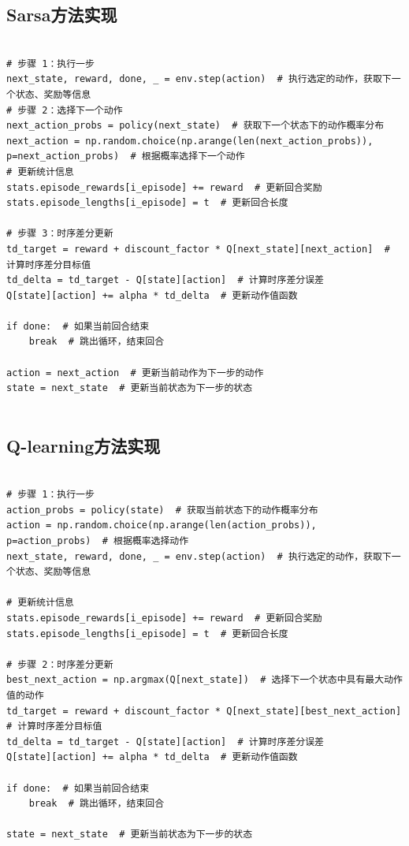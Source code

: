 \documentclass{ctexart}
\begin{document}
\subsection*{Sarsa方法实现}
\begin{verbatim}

# 步骤 1：执行一步
next_state, reward, done, _ = env.step(action)  # 执行选定的动作，获取下一个状态、奖励等信息
# 步骤 2：选择下一个动作
next_action_probs = policy(next_state)  # 获取下一个状态下的动作概率分布
next_action = np.random.choice(np.arange(len(next_action_probs)), p=next_action_probs)  # 根据概率选择下一个动作
# 更新统计信息
stats.episode_rewards[i_episode] += reward  # 更新回合奖励
stats.episode_lengths[i_episode] = t  # 更新回合长度

# 步骤 3：时序差分更新
td_target = reward + discount_factor * Q[next_state][next_action]  # 计算时序差分目标值
td_delta = td_target - Q[state][action]  # 计算时序差分误差
Q[state][action] += alpha * td_delta  # 更新动作值函数

if done:  # 如果当前回合结束
    break  # 跳出循环，结束回合
    
action = next_action  # 更新当前动作为下一步的动作
state = next_state  # 更新当前状态为下一步的状态


\end{verbatim}

\subsection*{Q-learning方法实现}
\begin{verbatim}

# 步骤 1：执行一步
action_probs = policy(state)  # 获取当前状态下的动作概率分布
action = np.random.choice(np.arange(len(action_probs)), p=action_probs)  # 根据概率选择动作
next_state, reward, done, _ = env.step(action)  # 执行选定的动作，获取下一个状态、奖励等信息

# 更新统计信息
stats.episode_rewards[i_episode] += reward  # 更新回合奖励
stats.episode_lengths[i_episode] = t  # 更新回合长度

# 步骤 2：时序差分更新
best_next_action = np.argmax(Q[next_state])  # 选择下一个状态中具有最大动作值的动作
td_target = reward + discount_factor * Q[next_state][best_next_action]  # 计算时序差分目标值
td_delta = td_target - Q[state][action]  # 计算时序差分误差
Q[state][action] += alpha * td_delta  # 更新动作值函数
    
if done:  # 如果当前回合结束
    break  # 跳出循环，结束回合
    
state = next_state  # 更新当前状态为下一步的状态

\end{verbatim}
\end{document}
